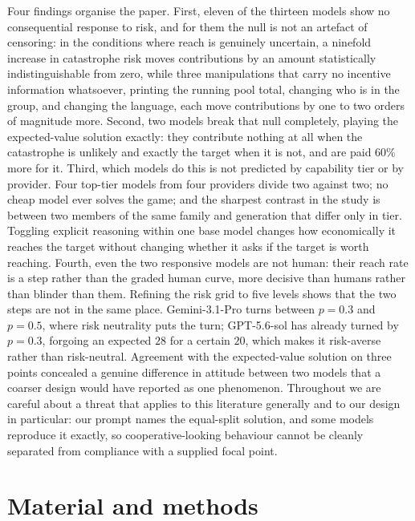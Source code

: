 \documentclass[openacc]{rsproca_new}
\begin{document}
Four findings organise the paper. First, eleven of the thirteen models show no consequential response to risk, and for them the null is not an artefact of censoring: in the conditions where reach is genuinely uncertain, a ninefold increase in catastrophe risk moves contributions by an amount statistically indistinguishable from zero, while three manipulations that carry no incentive information whatsoever, printing the running pool total, changing who is in the group, and changing the language, each move contributions by one to two orders of magnitude more. Second, two models break that null completely, playing the expected-value solution exactly: they contribute nothing at all when the catastrophe is unlikely and exactly the target when it is not, and are paid $60\%$ more for it. Third, which models do this is not predicted by capability tier or by provider. Four top-tier models from four providers divide two against two; no cheap model ever solves the game; and the sharpest contrast in the study is between two members of the same family and generation that differ only in tier. Toggling explicit reasoning within one base model changes how economically it reaches the target without changing whether it asks if the target is worth reaching. Fourth, even the two responsive models are not human: their reach rate is a step rather than the graded human curve, more decisive than humans rather than blinder than them. Refining the risk grid to five levels shows that the two steps are not in the same place. Gemini-3.1-Pro turns between $p=0.3$ and $p=0.5$, where risk neutrality puts the turn; GPT-5.6-sol has already turned by $p=0.3$, forgoing an expected $28$ for a certain $20$, which makes it risk-averse rather than risk-neutral. Agreement with the expected-value solution on three points concealed a genuine difference in attitude between two models that a coarser design would have reported as one phenomenon. Throughout we are careful about a threat that applies to this literature generally and to our design in particular: our prompt names the equal-split solution, and some models reproduce it exactly, so cooperative-looking behaviour cannot be cleanly separated from compliance with a supplied focal point.

\section{Material and methods}
\label{sec:methods}
\end{document}
